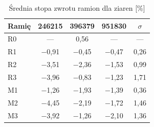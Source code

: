 \begin{table}[ht]
\centering
\caption{Średnia stopa zwrotu ramion dla ziaren [\%]}
\label{tab:ziarna-sigma}
\small
\begin{tabular}{|l|c|c|c|c|}
\hline
\textbf{Ramię} & \textbf{246215} & \textbf{396379} & \textbf{951830} & \textbf{$\sigma$} \\ \hline
R0 & --- & 0{,}56 & --- & --- \\ \hline
R1 & $-$0{,}91 & $-$0{,}45 & $-$0{,}47 & 0{,}26 \\ \hline
R2 & $-$3{,}51 & $-$2{,}36 & $-$1{,}53 & 0{,}99 \\ \hline
R3 & $-$3{,}96 & $-$0{,}83 & $-$1{,}23 & 1{,}71 \\ \hline
M1 & $-$1{,}26 & $-$1{,}93 & $-$1{,}39 & 0{,}36 \\ \hline
M2 & $-$4{,}45 & $-$2{,}19 & $-$1{,}72 & 1{,}46 \\ \hline
M3 & $-$3{,}92 & $-$1{,}26 & $-$2{,}10 & 1{,}36 \\ \hline
\end{tabular}
\end{table}
